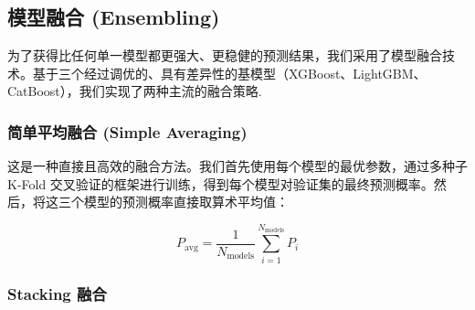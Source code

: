 \documentclass{thuemp}
\begin{document}




\subsection{模型融合 (Ensembling)}

为了获得比任何单一模型都更强大、更稳健的预测结果，我们采用了模型融合技术。基于三个经过调优的、具有差异性的基模型（XGBoost、LightGBM、CatBoost），我们实现了两种主流的融合策略.

\subsubsection{简单平均融合 (Simple Averaging)}

这是一种直接且高效的融合方法。我们首先使用每个模型的最优参数，通过多种子 K-Fold 交叉验证的框架进行训练，得到每个模型对验证集的最终预测概率。然后，将这三个模型的预测概率直接取算术平均值：

\[
P_{\text{avg}} = \frac{1}{N_{\text{models}}} \sum_{i=1}^{N_{\text{models}}} P_i
\]


\subsubsection{Stacking 融合}
\end{document}
